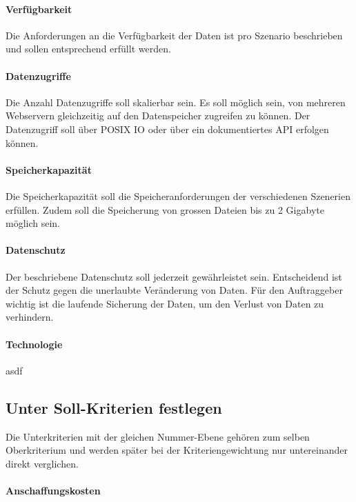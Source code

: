 \paragraph{Verfügbarkeit}\label{Soll-2}
Die Anforderungen an die Verfügbarkeit der Daten ist pro Szenario beschrieben und sollen entsprechend erfüllt werden. 

\paragraph{Datenzugriffe}\label{Soll-3}
Die Anzahl Datenzugriffe soll skalierbar sein. Es soll möglich sein, von mehreren Webservern gleichzeitig auf den Datenspeicher zugreifen zu können. Der Datenzugriff soll über POSIX IO oder über ein dokumentiertes API erfolgen können.

\paragraph{Speicherkapazität}\label{Soll-4}
Die Speicherkapazität soll die Speicheranforderungen der verschiedenen Szenerien erfüllen. Zudem soll die Speicherung von grossen Dateien bis zu 2 Gigabyte möglich sein.

\paragraph{Datenschutz}\label{Soll-5}
Der beschriebene Datenschutz soll jederzeit gewährleistet sein. Entscheidend ist der Schutz gegen die unerlaubte Veränderung von Daten. Für den Auftraggeber wichtig ist die laufende Sicherung der Daten, um den Verlust von Daten zu verhindern.

\paragraph{Technologie}\label{Soll-6}
asdf

\subsection{Unter Soll-Kriterien festlegen}
Die Unterkriterien mit der gleichen Nummer-Ebene gehören zum selben Oberkriterium und werden später bei der Kriteriengewichtung nur untereinander direkt verglichen.

\setcounter{paragraph}{0}
\renewcommand\theparagraph{Soll-1-\arabic{paragraph}}

\paragraph{Anschaffungskosten}\label{Soll-1-1}

